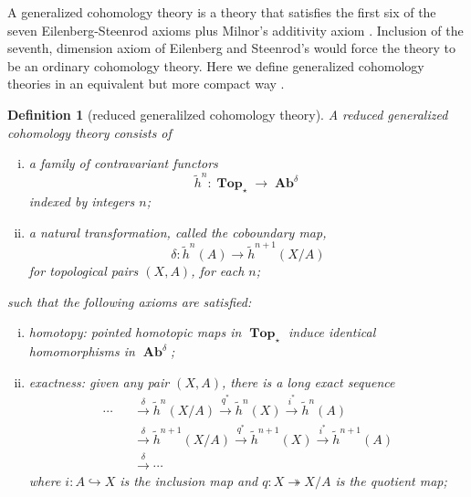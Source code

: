 \documentclass[sort&compress]{elsarticle}
\theoremstyle{theoremstyle}
\theoremstyle{framedtheoremstyle}
\theoremstyle{definitionstyle}
\newtheorem{dfn}[nul]{Definition}%
\theoremstyle{definitionstyle}
\theoremstyle{definitionstyle}
\theoremstyle{definitionstyle}
\theoremstyle{nameddefinitionstyle}
\theoremstyle{framednameddefinitionstyle}
\theoremstyle{proofstyle}
\theoremstyle{definitionstyle}
\newcommand{\fromto}{\rightarrow}
\newcommand{\oneone}{\hookrightarrow}
\newcommand{\onto}{\twoheadrightarrow}
\newcommand{\xfromto}[1]{\xrightarrow{#1}}
\newcommand{\Top}{\operatorname{\mathbf{Top}}}
\newcommand{\Ab}{\operatorname{\mathbf{Ab}}}
\newcommand{\paren}[1]{\left( #1 \right)}
\begin{document}
\begin{appendices}

A generalized cohomology theory \cite{Adams1, Adams2} is a theory that satisfies the first six of the seven Eilenberg-Steenrod axioms \cite{EilenbergSteenrod1, EilenbergSteenrod2} plus Milnor's additivity axiom \cite{Milnor1962}. Inclusion of the seventh, dimension axiom of Eilenberg and Steenrod's would force the theory to be an ordinary cohomology theory. Here we define generalized cohomology theories in an equivalent but more compact way \cite{Hatcher}.

\begin{dfn}[reduced generalilzed cohomology theory]
\label{dfn:reduced_generalized_cohomology_theory_2}
A reduced generalized cohomology theory consists of
\begin{enumerate}[(i)]
\item a family of contravariant functors
\begin{equation}
\tilde h^n: \Top_\star \fromto \Ab^\delta
\end{equation}
indexed by integers $n$;

\item a natural transformation, called the coboundary map,
\begin{equation}
\delta: \tilde h^n(A) \fromto \tilde h^{n+1}(X/A)
\end{equation}
for topological pairs $(X,A)$, for each $n$;
\end{enumerate}
such that the following axioms are satisfied:
\begin{enumerate}[(i)]
\item homotopy: pointed homotopic maps in $\Top_\star$ induce identical homomorphisms in $\Ab^\delta$;

\item exactness: given any pair $(X,A)$, there is a long exact sequence
\begin{eqnarray}
\cdots && \xfromto{\delta} \tilde h^n\paren{X/A} \xfromto{q^*} \tilde h^n(X) \xfromto{i^*} \tilde h^n(A) \nonumber\\
&&\xfromto{\delta} \tilde h^{n+1}\paren{X/A} \xfromto{q^*} \tilde h^{n+1}(X) \xfromto{i^*} \tilde h^{n+1}(A) \nonumber\\
&&\xfromto{\delta} \cdots
\end{eqnarray}
where $i: A \oneone X$ is the inclusion map and $q: X \onto X/A$ is the quotient map;


\end{enumerate}
\end{dfn}
\end{appendices}
\end{document}
